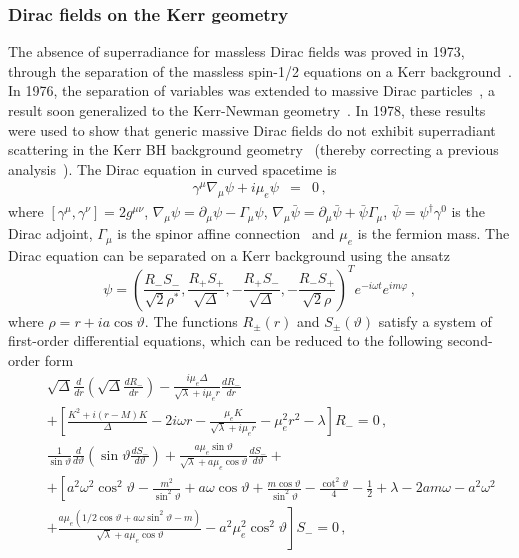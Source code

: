 \documentclass[11pt]{article}
\newcommand{\nn}{\nonumber}
\numberwithin{equation}{section} %
\begin{document}
\subsubsection{Dirac fields on the Kerr geometry} \label{DiracKerr}
The absence of superradiance for massless Dirac fields was proved in 1973, through the separation of the massless spin-1/2 equations on a Kerr background~\cite{Unruh:1973}. In 1976, the separation of variables was extended to massive Dirac particles~\cite{Chandra:1976}, a result soon generalized to the Kerr-Newman geometry~\cite{Page:1976,Lee:1977}. In 1978, these results were used to show that
generic massive Dirac fields do not exhibit superradiant scattering in the Kerr BH background geometry~\cite{Iyer:1978} (thereby correcting a previous analysis~\cite{Martellini:1977qf}).
The Dirac equation in curved spacetime is
%
\begin{eqnarray}
 \gamma^\mu\nabla_\mu\psi+i\mu_e \psi&=&0\,, \label{Dirac}
\end{eqnarray}
%
where $\left[\gamma^\mu,\gamma^\nu\right]=2 g^{\mu\nu}$, $\nabla_\mu\psi=\partial_\mu\psi-\Gamma_\mu\psi$, $\nabla_\mu\bar\psi=\partial_\mu\bar\psi+\bar\psi\Gamma_\mu$, $\bar\psi=\psi^\dagger\gamma^0$ is the Dirac adjoint, $\Gamma_\mu$ is the spinor affine connection~\cite{Chandra} and $\mu_e$ is the fermion mass. The Dirac equation can be separated on a Kerr background using the ansatz
\begin{equation}
 \psi=\left(\frac{R_{-}S_{-}}{\sqrt{2}\rho^*},\frac{R_{+}S_{+}}{\sqrt{\Delta}},-\frac{R_{+}S_{-}}{\sqrt{\Delta}},-\frac{R_{-}S_{+}}{\sqrt{2}\rho}\right)^T e^{-i\omega t}e^{im\varphi}\,, \label{reprDirac}
\end{equation}
where $\rho=r+ia\cos\vartheta$. The functions $R_{\pm}(r)$ and $S_{\pm}(\vartheta)$ satisfy a system of first-order differential equations, which can be reduced to the following second-order form~\cite{Page:1976}
\begin{eqnarray}
 &&\sqrt{\Delta}\frac{d}{dr}\left(\sqrt{\Delta}\frac{dR_-}{dr}\right)-\frac{i \mu_e \Delta}{\sqrt{\lambda}+i\mu_e r}\frac{dR_-}{dr}\nn\\
 &&+\left[\frac{K^2+i(r-M)K}{\Delta}-2i\omega r-\frac{\mu_e K}{\sqrt{\lambda}+i\mu_e r}-\mu_e^2 r^2-\lambda\right]R_-=0\,,  \label{radDirac}\\
 &&\frac{1}{\sin\vartheta}\frac{d}{d\vartheta}\left(\sin\vartheta\frac{dS_-}{d\vartheta}\right)+\frac{a\mu_e \sin\vartheta}{\sqrt{\lambda}+a\mu_e\cos\vartheta}\frac{dS_-}{d\vartheta}+\nn\\
 &&+\left[a^2\omega^2\cos^2\vartheta-\frac{m^2}{\sin^2\vartheta}+a\omega\cos\vartheta+
\frac{m\cos\vartheta}{\sin^2\vartheta}-\frac{\cot^2\vartheta}{4}-\frac{1}{2}+\lambda-2am\omega-a^2\omega^2\right.\nn\\
&&\left.+\frac{a\mu_e(1/2\cos\vartheta+a\omega\sin^2\vartheta-m)}{\sqrt{\lambda}+a\mu_e\cos\vartheta}-a^2\mu_e^2\cos^2\vartheta\right]S_-=0\,,
\end{eqnarray}
\end{document}
